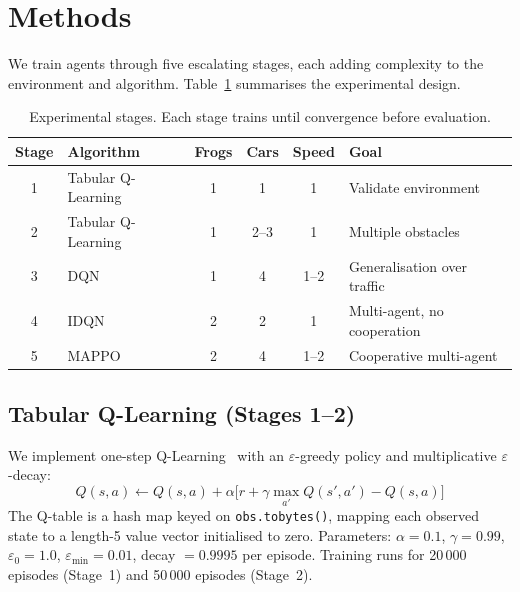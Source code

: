 \documentclass[12pt]{article}
\newcommand{\state}{s}
\newcommand{\action}{a}
\newcommand{\reward}{r}
\newcommand{\discount}{\gamma}
\begin{document}
\section{Methods}
\label{sec:methods}

We train agents through five escalating stages, each adding complexity to the
environment and algorithm.
Table~\ref{tab:stages} summarises the experimental design.

\begin{table}[h]
\centering
\caption{Experimental stages. Each stage trains until convergence before
  evaluation.}
\label{tab:stages}
\renewcommand{\arraystretch}{1.25}
\begin{tabular}{clcccp{3.8cm}}
\toprule
\textbf{Stage} & \textbf{Algorithm} & \textbf{Frogs} & \textbf{Cars}
  & \textbf{Speed} & \textbf{Goal} \\
\midrule
1 & Tabular Q-Learning & 1 & 1   & 1     & Validate environment \\
2 & Tabular Q-Learning & 1 & 2--3 & 1   & Multiple obstacles \\
3 & DQN                & 1 & 4   & 1--2  & Generalisation over traffic \\
4 & IDQN               & 2 & 2   & 1     & Multi-agent, no cooperation \\
5 & MAPPO              & 2 & 4   & 1--2  & Cooperative multi-agent \\
\bottomrule
\end{tabular}
\end{table}

\subsection{Tabular Q-Learning (Stages 1--2)}

We implement one-step Q-Learning~\citep{watkins1992q} with an $\varepsilon$-greedy
policy and multiplicative $\varepsilon$-decay:
\begin{equation}
  Q(\state, \action) \leftarrow Q(\state, \action)
    + \alpha \bigl[\reward + \discount \max_{\action'} Q(\state', \action')
    - Q(\state, \action)\bigr]
  \label{eq:qlearning}
\end{equation}
The Q-table is a hash map keyed on \texttt{obs.tobytes()}, mapping each
observed state to a length-5 value vector initialised to zero.  Parameters:
$\alpha = 0.1$, $\discount = 0.99$, $\varepsilon_0 = 1.0$,
$\varepsilon_{\min} = 0.01$, decay $= 0.9995$ per episode.
Training runs for 20\,000 episodes (Stage~1) and 50\,000 episodes (Stage~2).
\end{document}
